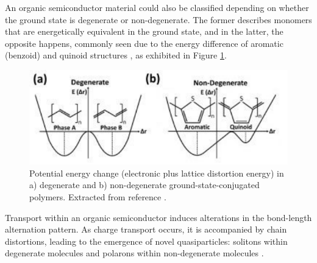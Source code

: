 

An organic semiconductor material could also be classified depending on whether the ground state is degenerate or non-degenerate. The former describes monomers that are energetically equivalent in the ground state, and in the latter, the opposite happens, commonly seen due to the energy difference of aromatic (benzoid) and quinoid structures \cite{heegerSolitonsConductingPolymers1988a}, as exhibited in Figure \ref{fig:energy}.

\begin{figure}[h]
  \centering
  \includegraphics[width=12cm]{Images/pdf/deg_pol.pdf}
  \caption[Degenerate and non-degenerate conjugated polymers]{Potential energy change (electronic plus lattice distortion energy) in a) degenerate and b) non-degenerate ground-state-conjugated polymers. Extracted from reference \cite{heydarigharahcheshmehTextureNanostructuralEngineering2020}.}
  \label{fig:energy}
\end{figure}

Transport within an organic semiconductor induces alterations in the bond-length alternation pattern. As charge transport occurs, it is accompanied by chain distortions, leading to the emergence of novel quasiparticles: solitons within degenerate molecules and polarons within non-degenerate molecules \cite{bredasRoleMobileOrganic1984}.

